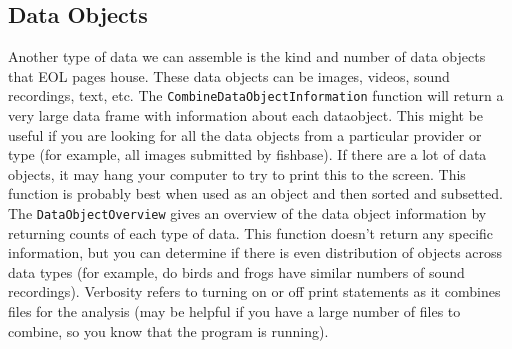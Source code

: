 \documentclass[12pt]{article}
\begin{document}
\subsection{Data Objects}
Another type of data we can assemble is the kind and number of data objects that EOL pages house. These data objects can be images, videos, sound recordings, text, etc. The \texttt{CombineDataObjectInformation} function will return a very large data frame with information about each dataobject. This might be useful if you are looking for all the data objects from a particular provider or type (for example, all images submitted by fishbase). If there are a lot of data objects, it may hang your computer to try to print this to the screen. This function is probably best when used as an object and then sorted and subsetted. The \texttt{DataObjectOverview} gives an overview of the data object information by returning counts of each type of data. This function doesn't return any specific information, but you can determine if there is even distribution of objects across data types (for example, do birds and frogs have similar numbers of sound recordings). Verbosity refers to turning on or off print statements as it combines files for the analysis (may be helpful if you have a large number of files to combine, so you know that the program is running). 
\end{document}
